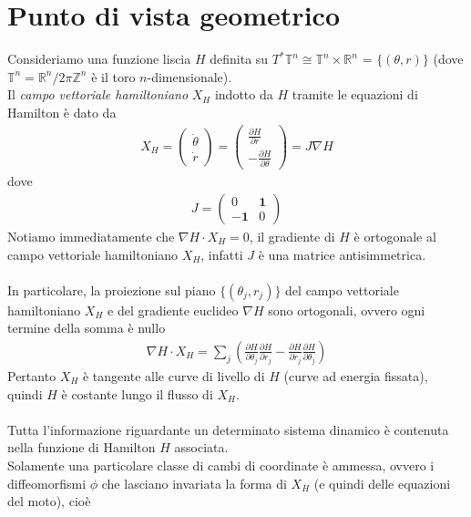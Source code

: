 \documentclass[twoside, 11pt]{amsbook}
\newcommand{\grad}{\nabla}
\newcommand{\0}{{(0)}}
\newcommand{\3}{{(3)}}
\theoremstyle{colonplain}
\theoremstyle{colondefinition}
\theoremstyle{colonremark}
\numberwithin{equation}{chapter}
\begin{document}
\section{Punto di vista geometrico}
Consideriamo una funzione liscia $H$ definita su $ T^*\mathbb{T}^n \cong \mathbb{T}^n \times \mathbb{R}^n$ = $\{(\theta, r)\}$ (dove $\mathbb{T}^n = \mathbb{R}^n/2\pi\mathbb{Z}^n$ è il toro $n$-dimensionale). \\
Il \textit{campo vettoriale hamiltoniano} $X_H$ indotto da $H$ tramite le equazioni di Hamilton è dato da 
\begin{align}\label{HamVectField}
    X_H = \begin{pmatrix}
        \dot{\theta} \\
        \dot{r}
    \end{pmatrix} =
    \begin{pmatrix}
        \frac{\partial H}{\partial r} \\
        -\frac{\partial H}{\partial \theta}
    \end{pmatrix} = J\grad H 
\end{align}
dove
\begin{align}
    J = \begin{pmatrix}
        0 & \mathbf{1} \\
        -\mathbf{1} & 0
    \end{pmatrix}
\end{align}
Notiamo immediatamente che $\nabla H \cdot X_H = 0$, il gradiente di $H$ è ortogonale al campo vettoriale hamiltoniano $X_H$, infatti $J$ è una matrice antisimmetrica. \\ \\
In particolare, la proiezione sul piano $\{(\theta_j, r_j)\}$ del campo vettoriale hamiltoniano $X_H$ e del gradiente euclideo $\nabla H$ sono ortogonali, ovvero ogni termine della somma è nullo
\begin{align}
    \nabla H \cdot X_H = \sum_j\left(\frac{\partial H}{\partial \theta_j}\frac{\partial H}{\partial r_j} - \frac{\partial H}{\partial r_j}\frac{\partial H}{\partial \theta_j}\right)
\end{align}
Pertanto $X_H$ è tangente alle curve di livello di $H$ (curve ad energia fissata), quindi $H$ è costante lungo il flusso di $X_H$. \\ \\
Tutta l'informazione riguardante un determinato sistema dinamico è contenuta nella funzione di Hamilton $H$ associata. \\
Solamente una particolare classe di cambi di coordinate è ammessa, ovvero i diffeomorfismi $\phi$ che lasciano invariata la forma di $X_H$ (e quindi delle equazioni del moto), cioè
\end{document}
